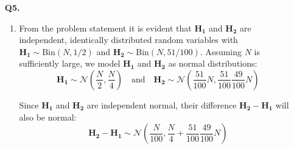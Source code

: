 \documentclass[10pt, letterpaper]{article}
\begin{document}
\begin{enumerate}
  \bigskip

  \item[\textbf{Q5.}]
    \begin{enumerate}
      \item

        From the problem statement it is evident that $\bm{H_1}$ and $\bm{H_2}$ are independent,
        identically distributed random variables with $\bm{H_1} \sim \text{Bin}(N, 1/2)$ and
        $\bm{H_2} \sim \text{Bin}(N, 51/100)$.  Assuming $N$ is sufficiently large, we model 
        $\bm{H_1}$ and $\bm{H_2}$ as normal distributions:
        \[
          \bm{H_1} \sim \mathcal{N}\left(\dfrac{N}{2}, \dfrac{N}{4}\right) \quad \text{and} \quad
          \bm{H_2} \sim \mathcal{N}\left(\dfrac{51}{100}N, \dfrac{51}{100}\dfrac{49}{100}N\right)
        \]

        Since $\bm{H_1}$ and $\bm{H_2}$ are independent normal, their difference $\bm{H_2} - \bm{H_1}$
        will also be normal:
        \[
          \bm{H_2} - \bm{H_1} \sim \mathcal{N}\left(\dfrac{N}{100}, \dfrac{N}{4} + \dfrac{51}{100}
          \dfrac{49}{100}N\right)
        \]
        \begin{figure}[H]
          \centering
        \end{figure}


\end{enumerate}
\end{enumerate}
\end{document}
